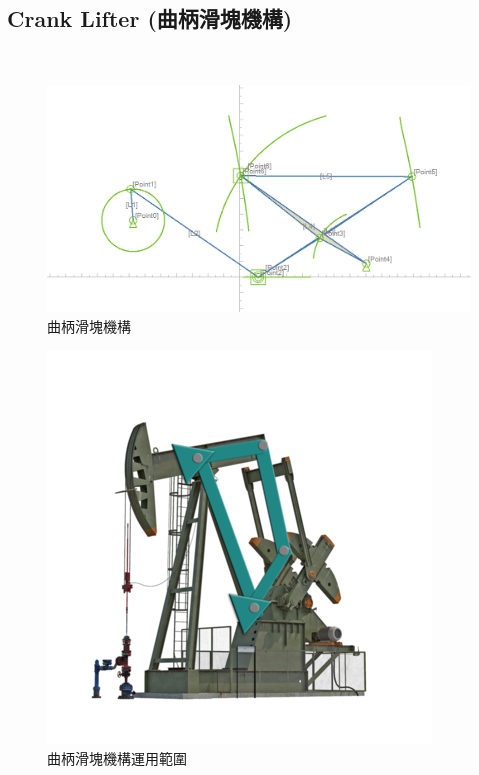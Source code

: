 \documentclass[14pt,a4paper]{report}  %
\newcommand{\fourteen}{\fontsize{14pt}{\baselineskip}\selectfont}%
\begin{document}
		\subsection{Crank Lifter (曲柄滑塊機構)}
       \hspace*{\fill} \\
       \fourteen {主要以6個連桿、7個接頭，4個雙接頭連桿、1個三接頭連桿所構成，如圖(3.1)，由四連桿機構衍伸而來多樣性運動型態、軌跡，可滿足一般運動需求，常用於汽車工業中加速與製動，從踏板的輸入到化油器、製動缸、自行車剎車都廣泛運用在其中，如圖(3.2)。}
     \begin{figure}[H]
        \centering
        \includegraphics[scale=0.5]{曲柄滑塊機構.png} 
        \caption{曲柄滑塊機構} %
        \label{fig:scale} %
    \end{figure}
    \begin{figure}[H]
        \centering
        \includegraphics[scale=0.6]{曲柄滑塊機構運用範圍.png} 
        \caption{曲柄滑塊機構運用範圍} %
        \label{fig:scale} %
    \end{figure}
    
\end{document}

